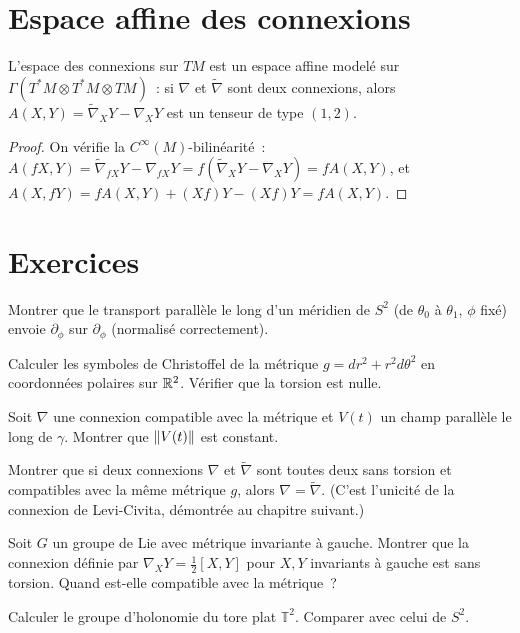 \section{Espace affine des connexions}

\begin{proposition}
L'espace des connexions sur $TM$ est un espace affine model\'e sur
$\Gamma(T^*M \otimes T^*M \otimes TM)$~: si $\nabla$ et $\tilde{\nabla}$ sont
deux connexions, alors $A(X,Y) = \tilde{\nabla}_X Y - \nabla_X Y$ est un tenseur
de type $(1,2)$.
\end{proposition}

\begin{proof}
On v\'erifie la $C^\infty(M)$-bilin\'earit\'e~:
$A(fX, Y) = \tilde{\nabla}_{fX}Y - \nabla_{fX}Y = f(\tilde{\nabla}_X Y - \nabla_X Y) = fA(X,Y)$,
et $A(X, fY) = fA(X,Y) + (Xf)Y - (Xf)Y = fA(X,Y)$.
\end{proof}

\section{Exercices}

\begin{exercice}
Montrer que le transport parall\`ele le long d'un m\'eridien de $S^2$ (de $\theta_0$
\`a $\theta_1$, $\phi$ fix\'e) envoie $\partial_\phi$ sur $\partial_\phi$
(normalis\'e correctement).
\end{exercice}

\begin{exercice}
Calculer les symboles de Christoffel de la m\'etrique $g = dr^2 + r^2 d\theta^2$
en coordonn\'ees polaires sur $\mathbb{R}^2$. V\'erifier que la torsion est nulle.
\end{exercice}

\begin{exercice}
Soit $\nabla$ une connexion compatible avec la m\'etrique et $V(t)$ un champ
parall\`ele le long de $\gamma$. Montrer que $\left\| V(t) \right\|$ est constant.
\end{exercice}

\begin{exercice}
Montrer que si deux connexions $\nabla$ et $\tilde{\nabla}$ sont toutes deux sans
torsion et compatibles avec la m\^eme m\'etrique $g$, alors $\nabla = \tilde{\nabla}$.
(C'est l'unicit\'e de la connexion de Levi-Civita, d\'emontr\'ee au chapitre suivant.)
\end{exercice}

\begin{exercice}
Soit $G$ un groupe de Lie avec m\'etrique invariante \`a gauche. Montrer que la
connexion d\'efinie par $\nabla_X Y = \frac{1}{2}[X, Y]$ pour $X, Y$ invariants
\`a gauche est sans torsion. Quand est-elle compatible avec la m\'etrique~?
\end{exercice}

\begin{exercice}
Calculer le groupe d'holonomie du tore plat $\mathbb{T}^2$. Comparer avec celui
de $S^2$.
\end{exercice}

